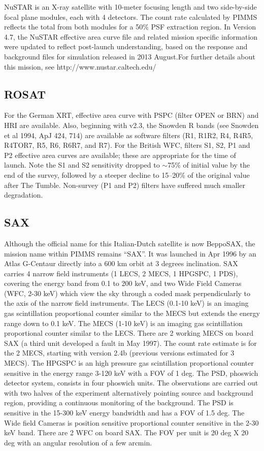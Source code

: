 \documentclass[11pt]{article}
\begin{document}
NuSTAR is an X-ray satellite with 10-meter focusing length and two
side-by-side focal plane modules, each with 4 detectors.  The count rate
calculated by PIMMS reflects the total from both modules for a 50\% PSF
extraction region. In Version 4.7, the NuSTAR effective area curve file
and related mission specific information were updated to reflect post-launch
understanding, based on the response and background files for simulation
released in 2013 August.For further details about this mission, see
  http://www.nustar.caltech.edu/

\subsection{ROSAT}

For the German XRT, effective area curve with PSPC (filter OPEN or BRN)
and HRI are available.  Also, beginning with v2.3, the Snowden R bands
(see Snowden et al 1994, ApJ 424, 714) are available as software filters
(R1, R1R2, R4, R4R5, R4TOR7, R5, R6, R6R7, and R7).
For the British WFC, filters S1, S2, P1 and P2
effective area curves are available; these are
appropriate for the time of launch. Note the S1 and S2 sensitivity dropped
to $\sim$75\% of initial value by the end  of the survey,  followed by a steeper
decline to 15--20\% of the original value after The Tumble.  Non-survey (P1
and P2) filters have suffered much smaller degradation.

\subsection{SAX}

Although the official name for this Italian-Dutch satellite is now
BeppoSAX, the mission name within PIMMS remains ``SAX''.  It
was launched in Apr 1996 by an Atlas G-Centaur directly into
a 600 km orbit at 3 degrees inclination.
SAX carries 4 narrow field instruments (1 LECS, 2 MECS, 1 HPGSPC, 1 PDS),
covering the energy band from 0.1 to 200 keV, and two Wide Field Cameras
(WFC, 2-30 keV) which view the sky through a coded mask perpendicularly
to the axis of the narrow field instruments.
The LECS (0.1-10 keV) is an imaging gas scintillation proportional
counter similar to the MECS but extends the energy range down to 0.1 keV.
The MECS (1-10 keV) is an imaging gas scintillation proportional counter
similar to the LECS. There are 2 working MECS on board SAX (a third unit
developed a fault in May 1997). The count rate estimate is for the 2 MECS,
starting with version 2.4b (previous versions estimated for 3 MECS).
The HPGSPC is an high pressure gas scintillation proportional
counter sensitive in the energy range 3-120 keV with a FOV of 1 deg.
The PSD, phoswich detector system, consists in four phoswich units.
The observations are carried out with two halves of the
experiment alternatively pointing source and background region, providing
a continuous monitoring of the background.
The PSD is sensitive in the 15-300 keV energy bandwidth and has a 
FOV of 1.5 deg.
The Wide field Cameras is position sensitive proportional counter
sensitive in the 2-30 keV band. There are 2 WFC on board SAX. The FOV
per unit is 20 deg X 20 deg with an angular resolution of a few arcmin.
\end{document}
